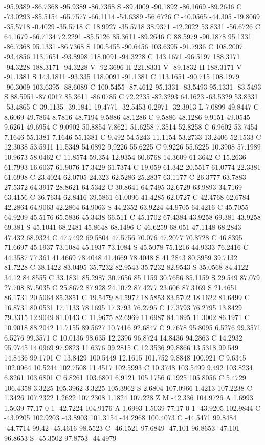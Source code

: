 {{{-95.9389 -86.7368 -95.9389 -86.7368 S -89.4009 -90.1892 -86.1669 -89.2646 C -73.0293 -85.5154 -65.7577 -66.1114 -54.6389 -56.6726 C -40.0565 -44.305 -19.8069 -35.5718 -0.4029 -35.5718 C 18.9927 -35.5718 38.9371 -42.2022 53.8331 -56.6726 C 64.1679 -66.7134 72.2291 -85.5126 85.3611 -89.2646 C 88.5979 -90.1878 95.1331 -86.7368 95.1331 -86.7368 S 100.5455 -90.6456 103.6395 -91.7936 C 108.2007 -93.4856 113.1651 -93.8998 118.0091 -94.3228 C 143.1671 -96.5197 188.3171 -94.3228 188.3171 -94.3228 V -92.3696 H 221.8331 V -89.1832 H 188.3171 V -91.1381 S 143.1811 -93.335 118.0091 -91.1381 C 113.1651 -90.715 108.1979 -90.3009 103.6395 -88.6089 C 100.5455 -87.4612 95.1331 -83.5493 95.1331 -83.5493 S 88.5951 -87.0017 85.3611 -86.0785 C 72.2235 -82.3293 64.1623 -63.5329 53.8331 -53.4865 C 39.1135 -39.1841 19.4771 -32.5453 0.2971 -32.3913 L 7.0899 49.8447 C 8.6069 49.7864 8.7816 48.7194 9.5886 48.1286 C 9.5886 48.1286 9.9151 49.0545 9.6261 49.6954 C 9.0902 50.8854 7.8621 51.6258 7.3514 52.8258 C 6.9602 53.7454 7.1646 55.1381 7.1646 55.1381 C 9.492 54.5243 11.1154 53.2733 13.2406 52.1533 C 12.3038 53.5911 11.5349 54.0892 9.9226 55.6225 C 9.9226 55.6225 10.3908 57.1989 10.9673 58.0462 C 11.8574 59.354 12.9354 60.6768 14.3609 61.3642 C 15.2636 61.7993 16.6037 61.9076 17.3429 61.7374 C 19.059 61.342 20.5517 61.0774 22.3381 61.6998 C 23.4024 62.0705 24.323 62.5286 25.2837 63.1177 C 26.3777 63.7883 27.5372 64.3917 28.8621 64.5342 C 30.8641 64.7495 32.6729 63.9893 34.7169 63.4156 C 36.7634 62.8416 39.5861 61.0096 41.4285 62.0727 C 42.4768 62.6784 42.2864 64.9063 42.2864 64.9063 S 44.2352 63.9224 44.9705 64.4216 C 45.7055 64.9209 45.5176 65.5836 45.3438 66.511 C 45.1702 67.4384 43.9258 69.381 43.9258 69.381 S 45.1041 68.2481 45.8648 68.1496 C 46.6259 68.051 47.1148 68.2843 47.432 68.9324 C 47.7492 69.5804 47.5756 70.076 47.2077 70.8728 C 46.8395 71.6697 45.1937 73.1084 45.1937 73.1084 S 45.5078 75.1216 44.9333 76.2416 C 44.3587 77.361 41.4669 78.4048 41.4669 78.4048 S 41.2843 80.3959 39.7132 81.7228 C 38.1422 83.0495 35.7232 82.9543 35.7232 82.9543 S 35.0568 84.4122 34.12 84.8555 C 33.1831 85.2987 30.7656 85.1159 30.7656 85.1159 S 29.549 87.079 27.708 87.5035 C 25.8672 87.928 24.1072 87.4277 23.606 87.3169 S 21.4651 86.1731 20.5064 85.3851 C 19.5479 84.5972 18.5853 83.5702 18.1622 81.6499 C 16.8731 80.0531 17.1133 78.1695 17.3793 76.2795 C 17.3793 76.2795 13.8429 79.3315 12.9049 81.0143 C 11.9675 82.6969 11.6987 84.1895 11.3002 86.1971 C 10.9018 88.2042 11.7155 89.5627 10.7416 92.6847 C 9.7678 95.8095 6.5276 99.3571 6.5276 99.3571 C 10.0136 98.635 12.2396 96.8724 14.8436 94.2863 C 14.2932 95.9745 14.0969 97.9823 11.6376 99.2815 C 12.3536 99.8866 13.5318 99.549 14.8436 99.1701 C 13.8429 100.5449 12.1615 101.752 9.8848 100.921 C 9.6345 102.0964 10.5244 102.7508 11.4517 102.5993 C 10.3748 103.5499 9.492 103.8234 6.8261 103.6801 C 6.8261 103.6801 6.9121 105.1756 6.1925 105.8056 C 5.4729 106.4358 3.3225 105.3962 3.3225 105.3962 S 2.6804 107.0966 1.4213 107.2238 C 1.3426 107.2322 1.2622 107.2308 1.1824 107.228 Z M -42.336 104.9726 A 1.6993 1.5039 77.17 0 1 -42.7224 104.9176 A 1.6993 1.5039 77.17 0 1 -43.9205 102.9844 C -43.9205 102.9203 -43.8903 101.3154 -44.2968 100.4073 C -44.5471 99.8484 -44.7714 99.42 -45.4616 98.5523 C -46.1521 97.6849 -47.101 96.8653 -47.101 96.8653 S -45.3502 97.8753 -44.4979 }}}
